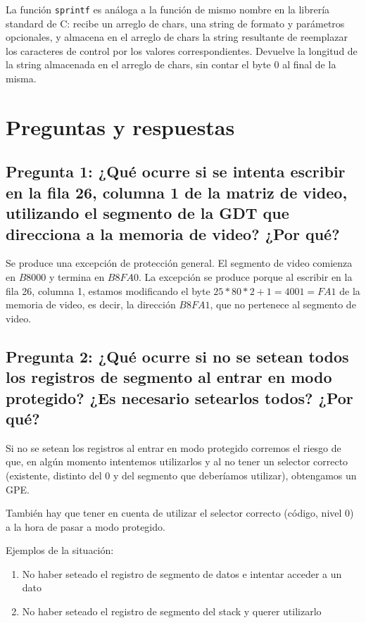 \documentclass[a4paper,10pt,twoside]{article}
\begin{document}
La función \texttt{sprintf} es análoga a la función de mismo nombre en la librería standard de C: recibe un arreglo de chars, una string de formato y parámetros opcionales, y almacena en el arreglo de chars la string resultante de reemplazar los caracteres de control por los valores correspondientes. Devuelve la longitud de la string almacenada en el arreglo de chars, sin contar el byte 0 al final de la misma.




\section{Preguntas y respuestas}


\subsection{Pregunta 1: ¿Qué ocurre si se intenta escribir en la fila 26, columna 1 de la matriz de video, utilizando el segmento de la GDT que direcciona a la memoria de video? ¿Por qué?}

Se produce una excepción de protección general. El segmento de video comienza en $B8000$ y termina en $B8FA0$. La excepción se produce porque al escribir en la fila 26, columna 1, estamos modificando el byte $25 * 80 * 2 + 1 = 4001 = FA1$ de la memoria de video, es decir, la dirección $B8FA1$, que no pertenece al segmento de video.

\subsection{Pregunta 2: ¿Qué ocurre si no se setean todos los registros de segmento al entrar en
modo protegido? ¿Es necesario setearlos todos? ¿Por qué?}
Si no se setean los registros al entrar en modo protegido corremos el riesgo de que, en algún momento intentemos utilizarlos y al no tener un selector correcto (existente, distinto del 0 y del segmento que deberíamos utilizar), obtengamos un GPE.

También hay que tener en cuenta de utilizar el selector correcto (código, nivel 0) a la hora de pasar a modo protegido.

Ejemplos de la situación:

\begin{enumerate}
	\item No haber seteado el registro de segmento de datos e intentar acceder a un dato
	\item No haber seteado el registro de segmento del stack y querer utilizarlo
\end{enumerate}
\end{document}
